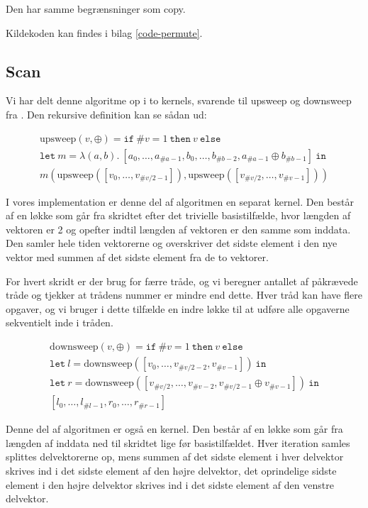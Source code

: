 Den har samme begrænsninger som copy.

Kildekoden kan findes i bilag \ref{code-permute}.

\subsection{Scan}

Vi har delt denne algoritme op i to kernels, svarende til upsweep og downsweep
fra \cite{gpu-scan}. Den rekursive definition kan se sådan ud:

\[
\begin{array}{l}
\mbox{upsweep}(v, \oplus) = \mathtt{if\ } \#v = 1 \mathtt{\ then \ } v \mathtt{\ else}\\
\mathtt{let\ } m = \lambda(a, b).\ [a_0, \ldots, a_{\#a-1}, b_0, \ldots, b_{\#b-2}, a_{\#a-1} \oplus b_{\#b-1}] \mathtt{\ in}\\
m(\mbox{upsweep}([v_0, \ldots, v_{\#v/2-1}]), \mbox{upsweep}([v_{\#v/2}, \ldots, v_{\#v-1}]))
\end{array}
\]

I vores implementation er denne del af algoritmen en separat kernel.
Den består af en løkke som går fra skridtet efter det trivielle basistilfælde,
hvor længden af vektoren er 2 og opefter indtil længden af vektoren er den
samme som inddata. Den samler hele tiden vektorerne og overskriver det sidste 
element i den nye vektor med summen af det sidste element fra de to vektorer.

For hvert skridt er der brug for færre tråde, og vi beregner antallet af 
påkrævede tråde og tjekker at trådens nummer er mindre end dette.
Hver tråd kan have flere opgaver, og vi bruger i dette tilfælde en indre
løkke til at udføre alle opgaverne sekventielt inde i tråden.

\[
\begin{array}{l}
\mbox{downsweep}(v, \oplus) = \mathtt{if\ } \#v = 1 \mathtt{\ then \ } v \mathtt{\ else}\\
\mathtt{let\ } l = \mbox{downsweep}([v_0, \ldots, v_{\#v/2-2}, v_{\#v-1}]) \mathtt{\ in}\\
\mathtt{let\ } r = \mbox{downsweep}([v_{\#v/2}, \ldots, v_{\#v-2}, v_{\#v/2-1} \oplus v_{\#v-1}]) \mathtt{\ in}\\
\mbox{$[l_0, \ldots, l_{\#l-1}, r_0, \ldots, r_{\#r-1}]$}
\end{array}
\]

Denne del af algoritmen er også en kernel.
Den består af en løkke som går fra længden af inddata ned til skridtet
lige før basistilfældet.
Hver iteration samles splittes delvektorerne op, mens summen af
det sidste element i hver delvektor skrives ind i det sidste element af den
højre delvektor, det oprindelige sidste element i den højre delvektor
skrives ind i det sidste element af den venstre delvektor.


